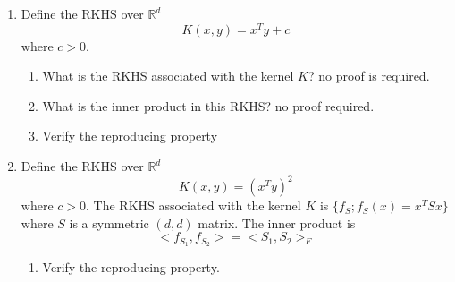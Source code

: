 \documentclass{article}[12pt]
\begin{document}
\begin{enumerate}
\item Define the RKHS  over $\mathbb{R}^d$
$$K(x,y)=x^Ty+c$$
where $c>0$. 
\begin{enumerate}
\item
What is the RKHS associated with the kernel $K$? no proof is required. 
\item 
What is the inner product in this RKHS? no proof required.  
\item 
Verify the reproducing property
\end{enumerate}
\item Define the RKHS  over $\mathbb{R}^d$
$$K(x,y)=(x^Ty)^2$$
where $c>0$. 
The RKHS associated with the kernel $K$ is $\{f_S;f_S(x)=x^T S x\}$ where $S$ is a symmetric $(d,d)$ matrix. The inner product is
\begin{equation} \label{equ:frob}
<f_{S_1},f_{S_2}>=<S_1,S_2>_F
\end{equation}
\begin{enumerate}
\item
Verify the reproducing property. 


\end{enumerate}
\end{enumerate}
\end{document}
